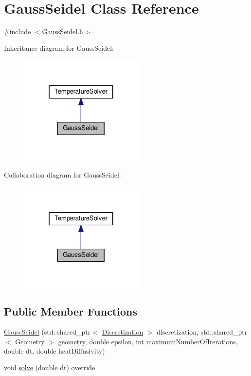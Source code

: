 \hypertarget{classGaussSeidel}{}\section{Gauss\+Seidel Class Reference}
\label{classGaussSeidel}


{\ttfamily \#include $<$Gauss\+Seidel.\+h$>$}



Inheritance diagram for Gauss\+Seidel\+:
\nopagebreak
\begin{figure}[H]
\begin{center}
\leavevmode
\includegraphics[width=178pt]{classGaussSeidel__inherit__graph}
\end{center}
\end{figure}


Collaboration diagram for Gauss\+Seidel\+:
\nopagebreak
\begin{figure}[H]
\begin{center}
\leavevmode
\includegraphics[width=178pt]{classGaussSeidel__coll__graph}
\end{center}
\end{figure}
\subsection*{Public Member Functions}
\begin{DoxyCompactItemize}
\item 
\mbox{\hyperlink{classGaussSeidel_a65c96c3cedc1a2d0a50ed0e2104ec290}{Gauss\+Seidel}} (std\+::shared\+\_\+ptr$<$ \mbox{\hyperlink{classDiscretization}{Discretization}} $>$ discretization, std\+::shared\+\_\+ptr$<$ \mbox{\hyperlink{classGeometry}{Geometry}} $>$ geometry, double epsilon, int maximum\+Number\+Of\+Iterations, double dt, double heat\+Diffusivity)
\item 
void \mbox{\hyperlink{classGaussSeidel_a171c7ffb638a311696c2c62b737d45d0}{solve}} (double dt) override
\end{DoxyCompactItemize}
